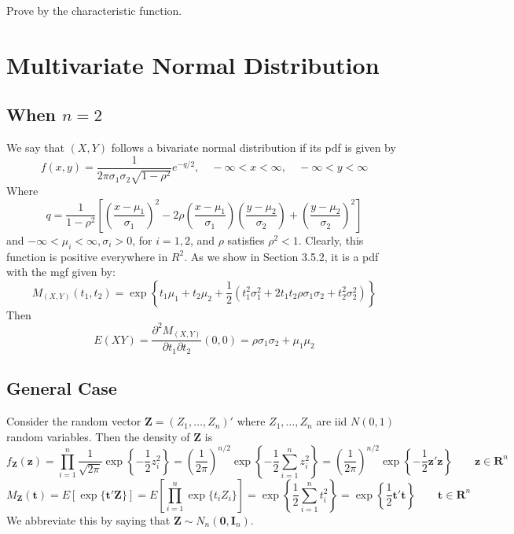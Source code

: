 \begin{note}
Prove by the characteristic function.
\end{note}
\section{Multivariate Normal Distribution}

\subsection{When \texorpdfstring{$n=2$}{n=2}}

We say that $(X, Y)$ follows a bivariate normal distribution if its pdf is given by
\[
f(x, y)=\frac{1}{2 \pi \sigma_1 \sigma_2 \sqrt{1-\rho^2}} e^{-q / 2}, \quad-\infty<x<\infty, \quad-\infty<y<\infty
\]
Where
\[
q=\frac{1}{1-\rho^2}\left[\left(\frac{x-\mu_1}{\sigma_1}\right)^2-2 \rho\left(\frac{x-\mu_1}{\sigma_1}\right)\left(\frac{y-\mu_2}{\sigma_2}\right)+\left(\frac{y-\mu_2}{\sigma_2}\right)^2\right]
\]
and $-\infty<\mu_i<\infty, \sigma_i>0$, for $i=1,2$, and $\rho$ satisfies $\rho^2<1$. Clearly, this function is positive everywhere in $R^2$. As we show in Section 3.5.2, it is a pdf with the mgf given by:
\[
M_{(X, Y)}\left(t_1, t_2\right)=\exp \left\{t_1 \mu_1+t_2 \mu_2+\frac{1}{2}\left(t_1^2 \sigma_1^2+2 t_1 t_2 \rho \sigma_1 \sigma_2+t_2^2 \sigma_2^2\right)\right\}
\]
Then
\[
E(XY)=\frac{ \partial^{2}M_{(X,Y)} }{ \partial t_1\partial t_2 } (0,0)=\rho\sigma_1\sigma_2+\mu_1\mu_2
\]
\subsection{General Case}

Consider the random vector $\mathbf{Z}=(Z_1,\dots,Z_n)'$ where $Z_1,\dots,Z_n$ are iid $N(0,1)$ random variables. Then the density of $\mathbf{Z}$ is
\[
f_{\mathbf{Z}}(\mathbf{z})=\prod_{i=1}^{n} \frac{1}{\sqrt{ 2\pi }}\exp \left\{  -\frac{1}{2}z_i^{2}  \right\}=\left( \frac{1}{2\pi}  \right)^{n/2 }\exp \left\{  -\frac{1}{2}\sum_{i=1}^{n} z_i^{2}  \right\}=\left( \frac{1}{2\pi}  \right)^{n/2 }\exp \left\{  -\frac{1}{2}\mathbf{z}'\mathbf{z}  \right\}\qquad \mathbf{z}\in \mathbf{R}^{n}
\]
\[
M_{\mathbf{Z}}(\mathbf{t})=E[\exp \{ \mathbf{t}'\mathbf{Z} \}]=E\left[ \prod_{i=1}^{n} \exp \{ t_iZ_i \} \right]=\exp \left\{  \frac{1}{2}\sum_{i=1}^{n} t_i^{2}  \right\}=\exp \left\{  \frac{1}{2}\mathbf{t}'\mathbf{t}  \right\}\qquad \mathbf{t}\in \mathbf{R}^{n}
\]
We abbreviate this by saying that $\mathbf{Z}\sim N_n(\mathbf{0},\mathbf{I}_n)$.

